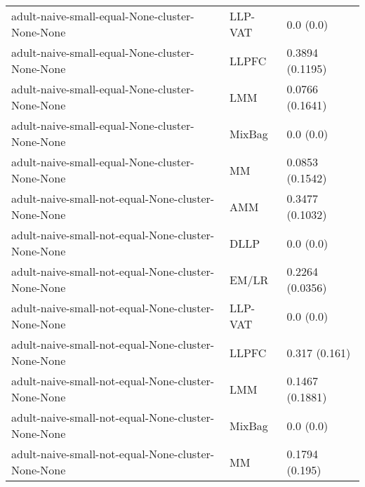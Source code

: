 \begin{longtable}{lll}
                                                               adult-naive-small-equal-None-cluster-None-None &   LLP-VAT &                             0.0 (0.0) \\
                                                               adult-naive-small-equal-None-cluster-None-None &     LLPFC &                       0.3894 (0.1195) \\
                                                               adult-naive-small-equal-None-cluster-None-None &       LMM &                       0.0766 (0.1641) \\
                                                               adult-naive-small-equal-None-cluster-None-None &    MixBag &                             0.0 (0.0) \\
                                                               adult-naive-small-equal-None-cluster-None-None &        MM &                       0.0853 (0.1542) \\
                                                           adult-naive-small-not-equal-None-cluster-None-None &       AMM &                       0.3477 (0.1032) \\
                                                           adult-naive-small-not-equal-None-cluster-None-None &      DLLP &                             0.0 (0.0) \\
                                                           adult-naive-small-not-equal-None-cluster-None-None &     EM/LR &                       0.2264 (0.0356) \\
                                                           adult-naive-small-not-equal-None-cluster-None-None &   LLP-VAT &                             0.0 (0.0) \\
                                                           adult-naive-small-not-equal-None-cluster-None-None &     LLPFC &                         0.317 (0.161) \\
                                                           adult-naive-small-not-equal-None-cluster-None-None &       LMM &                       0.1467 (0.1881) \\
                                                           adult-naive-small-not-equal-None-cluster-None-None &    MixBag &                             0.0 (0.0) \\
                                                           adult-naive-small-not-equal-None-cluster-None-None &        MM &                        0.1794 (0.195) \\

\end{longtable}
